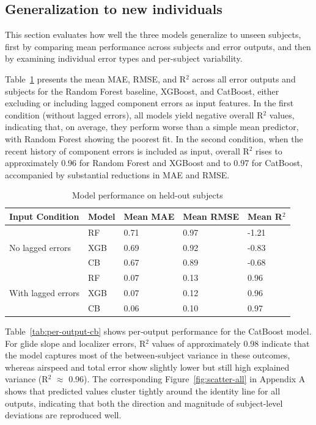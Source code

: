 \documentclass[11pt, a4paper]{article}
\begin{document}
\subsection{Generalization to new individuals}
This section evaluates how well the three models generalize to unseen subjects, first by comparing mean performance across subjects and error outputs, and then by examining individual error types and per-subject variability.

Table~\ref{tab:sub-overall} presents the mean MAE, RMSE, and R$^2$ across all error outputs and subjects for the Random Forest baseline, XGBoost, and CatBoost, either excluding or including lagged component errors as input features. In the first condition (without lagged errors), all models yield negative overall R$^2$ values, indicating that, on average, they perform worse than a simple mean predictor, with Random Forest showing the poorest fit. In the second condition, when the recent history of component errors is included as input, overall R$^2$ rises to approximately 0.96 for Random Forest and XGBoost and to 0.97 for CatBoost, accompanied by substantial reductions in MAE and RMSE.


\begin{table}[htbp]
	\caption{Model performance on held-out subjects}
	\label{tab:sub-overall}
	\centering
	\small
	\begin{tabular}{p{3cm}llll}
		\toprule                                 	
		Input Condition 	&Model          	&  Mean MAE      &  Mean RMSE      & Mean R$^2$ \\ 
		\midrule
		\multirow{3}{*}{No lagged errors} &RF  & 0.71 & 0.97 & -1.21 \\
														&XGB & 0.69  	& 0.92  & -0.83 \\
														&CB   & 0.67  & 0.89 & -0.68 \\
		\midrule
		\multirow{3}{*}{With lagged errors} &RF   & 0.07 	& 0.13 & 0.96 \\
														&XGB         & 0.07 & 0.12 & 0.96 \\
														&CB  & 0.06 	& 0.10 & 0.97\\ 
		\bottomrule
	\end{tabular}
\end{table}

 Table~\ref{tab:per-output-cb} shows per‑output performance for the CatBoost model. For glide slope and localizer errors, R$^2$ values of approximately 0.98 indicate that the model captures most of the between‑subject variance in these outcomes, whereas airspeed and total error show slightly lower but still high explained variance (R$^2$ $\approx$ 0.96). The corresponding Figure~\ref{fig:scatter-all} in Appendix A shows that predicted values cluster tightly around the identity line for all outputs, indicating that both the direction and magnitude of subject‑level deviations are reproduced well. 
\end{document}

